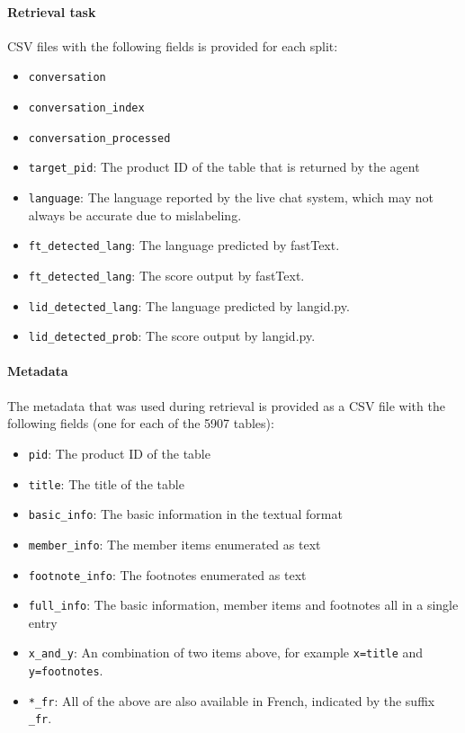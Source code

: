 \documentclass[11pt]{article}
\begin{document}
\paragraph{Retrieval task} CSV files with the following fields is provided for each split:

\begin{itemize}
    \item \verb|conversation|
    \item \verb|conversation_index|
    \item \verb|conversation_processed|
    \item \verb|target_pid|: The product ID of the table that is returned by the agent
    \item \verb|language|: The language reported by the live chat system, which may not always be accurate due to mislabeling.
    \item \verb|ft_detected_lang|: The language predicted by fastText.
    \item \verb|ft_detected_lang|: The score output by fastText.
    \item \verb|lid_detected_lang|: The language predicted by langid.py.
    \item \verb|lid_detected_prob|: The score output by langid.py.
\end{itemize}

\paragraph{Metadata} The metadata that was used during retrieval is provided as a CSV file with the following fields (one for each of the 5907 tables):
\begin{itemize}
    \item \verb|pid|: The product ID of the table
    \item \verb|title|: The title of the table
    \item \verb|basic_info|: The basic information in the textual format
    \item \verb|member_info|: The member items enumerated as text
    \item \verb|footnote_info|: The footnotes enumerated as text
    \item \verb|full_info|: The basic information, member items and footnotes all in a single entry
    \item \verb|x_and_y|: An combination of two items above, for example \verb|x=title| and \verb|y=footnotes|.
    \item \verb|*_fr|: All of the above are also available in French, indicated by the suffix \verb|_fr|.
    
\end{itemize}
\end{document}
